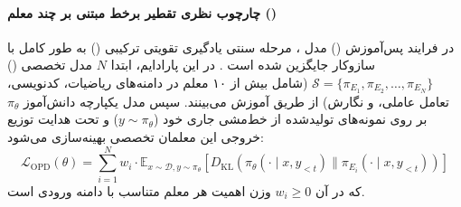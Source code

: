 \item {}

\paragraph*{چارچوب نظری تقطیر برخط مبتنی بر چند معلم ()}
در فرایند پس‌آموزش () مدل ، مرحله سنتی یادگیری تقویتی ترکیبی () به طور کامل با سازوکار  جایگزین شده است \cite{deepseek2026v4}. در این پارادایم، ابتدا $N$ مدل تخصصی () $\mathcal{S} = \{\pi_{E_1}, \pi_{E_2}, \dots, \pi_{E_N}\}$ (شامل بیش از ۱۰ معلم در دامنه‌های ریاضیات، کدنویسی، تعامل عاملی، و نگارش) از طریق  آموزش می‌بینند. سپس مدل یکپارچه دانش‌آموز $\pi_\theta$ بر روی نمونه‌های تولیدشده از خط‌مشی جاری خود ($y \sim \pi_\theta$) و تحت هدایت توزیع خروجی این معلمان تخصصی بهینه‌سازی می‌شود:
\begin{equation}
    \mathcal{L}_{\mathrm{OPD}}(\theta) = \sum_{i=1}^N w_i \cdot \mathbb{E}_{x \sim \mathcal{D}, y \sim \pi_\theta} \left[ D_{\mathrm{KL}}\left(\pi_\theta(\cdot \mid x, y_{<t}) \parallel \pi_{E_i}(\cdot \mid x, y_{<t})\right) \right]
\end{equation}
که در آن $w_i \ge 0$ وزن اهمیت هر معلم متناسب با دامنه ورودی است.

